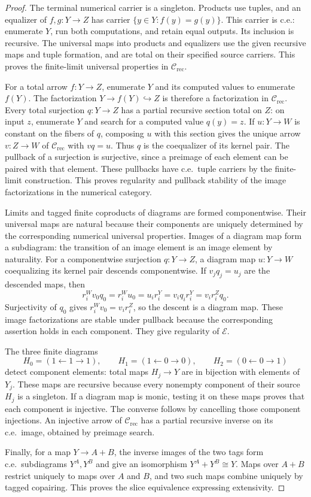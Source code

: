 \documentclass[11pt]{article}
\begin{document}
\begin{proof}
The terminal numerical carrier is a singleton. Products use tuples,
and an equalizer of $f,g:Y\to Z$ has carrier
$\{y\in Y:f(y)=g(y)\}$. This carrier is c.e.: enumerate $Y$, run
both computations, and retain equal outputs. Its inclusion is
recursive. The universal maps into products and equalizers use the
given recursive maps and tuple formation, and are total on their
specified source carriers. This proves the finite-limit universal
properties in $\mathcal C_{\mathrm{rec}}$.

For a total arrow $f:Y\to Z$, enumerate $Y$ and its computed
values to enumerate $f(Y)$. The factorization
$Y\to f(Y)\hookrightarrow Z$ is therefore a factorization in
$\mathcal C_{\mathrm{rec}}$. Every total surjection
$q:Y\to Z$ has a partial recursive section total on $Z$: on input
$z$, enumerate $Y$ and search for a computed value $q(y)=z$.
If $u:Y\to W$ is constant on the fibers of $q$, composing $u$
with this section gives the unique arrow $v:Z\to W$ of
$\mathcal C_{\mathrm{rec}}$ with $vq=u$. Thus $q$ is the
coequalizer of its kernel pair.
The pullback of a surjection is surjective, since a preimage of
each element can be paired with that element. These pullbacks
have c.e.\ tuple carriers by the finite-limit construction.
This proves regularity and pullback stability of the image
factorizations in the numerical category.

Limits and tagged finite coproducts of diagrams are formed
componentwise. Their universal maps are natural because their
components are uniquely determined by the corresponding numerical
universal properties. Images of a diagram map form a subdiagram:
the transition of an image element is an image element by naturality.
For a componentwise surjection $q:Y\to Z$, a diagram map
$u:Y\to W$ coequalizing its kernel pair descends componentwise.
If $v_jq_j=u_j$ are the descended maps, then
\[
 r_i^Wv_0q_0=r_i^Wu_0=u_i r_i^Y
 =v_iq_i r_i^Y=v_i r_i^Zq_0.
\]
Surjectivity of $q_0$ gives $r_i^Wv_0=v_i r_i^Z$, so the
descent is a diagram map. These image factorizations are stable
under pullback because the corresponding assertion holds in
each component. They give regularity of $\mathcal E$.

The three finite diagrams
\[
 H_0=(1\leftarrow1\to1),\qquad
 H_1=(1\leftarrow0\to0),\qquad
 H_2=(0\leftarrow0\to1)
\]
detect component elements: total maps $H_j\to Y$ are in bijection
with elements of $Y_j$. These maps are recursive because every
nonempty component of their source $H_j$ is a singleton.
If a diagram map is monic,
testing it on these maps proves that each component is injective.
The converse follows by cancelling those component injections.
An injective arrow of $\mathcal C_{\mathrm{rec}}$ has a partial recursive inverse
on its c.e.\ image, obtained by preimage search.

Finally, for a map $Y\to A+B$, the inverse images of the two
tags form c.e.\ subdiagrams $Y^A,Y^B$ and give an isomorphism
$Y^A+Y^B\cong Y$. Maps over $A+B$ restrict uniquely to maps
over $A$ and $B$, and two such maps combine uniquely by tagged
copairing. This proves the slice equivalence expressing extensivity.
\end{proof}
\end{document}
